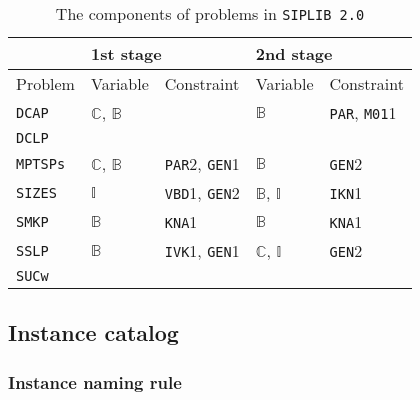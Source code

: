 \begin{table}[H]
	\centering
	\caption{The components of problems in \texttt{SIPLIB 2.0}}
	\label{table:prob_class}
	\begin{tabular}{@{}lllll@{}}
		\toprule
		& \multicolumn{2}{l}{1st stage}                              				  & \multicolumn{2}{l}{2nd stage}                             			      \\ \midrule
		Problem 	     & Variable                    & Constraint                   & Variable                    & Constraint                  \\ \midrule
		\texttt{DCAP}    & $\mathbb{C}$, $\mathbb{B}$ &                              & $\mathbb{B}$                & \texttt{PAR}, \texttt{M01}1 \\
		\texttt{DCLP}	 &							&								&							&								\\				
		\texttt{MPTSPs}  & $\mathbb{C}$, $\mathbb{B}$ & \texttt{PAR}2, \texttt{GEN}1 & $\mathbb{B}$                & \texttt{GEN}2               \\
		\texttt{SIZES}   & $\mathbb{I}$ 			   & \texttt{VBD}1, \texttt{GEN}2 & $\mathbb{B}$, $\mathbb{I}$  & \texttt{IKN}1               \\
		\texttt{SMKP}    & $\mathbb{B}$                & \texttt{KNA}1                & $\mathbb{B}$                & \texttt{KNA}1               \\
		\texttt{SSLP}    & $\mathbb{B}$               & \texttt{IVK}1, \texttt{GEN}1 & $\mathbb{C}$, $\mathbb{I}$ & \texttt{GEN}2               \\
		\texttt{SUCw}    &                             &                              &                             &                             \\ \bottomrule
	\end{tabular}

\end{table}

\subsection{Instance catalog}

\subsubsection{Instance naming rule}

